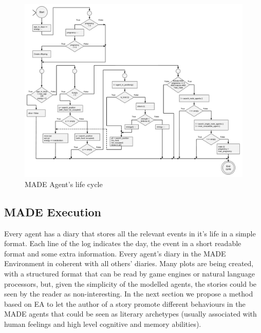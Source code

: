 \documentclass[runningheads]{llncs}
\begin{document}
\begin{figure}
\begin{center}
\includegraphics[scale=0.32]{img/life_cycle.pdf}
\caption{MADE Agent's life cycle}
\label{fig:lifecycle}
\end{center}
\end{figure}



\subsection{MADE Execution}

Every agent has a diary that stores all the relevant events in it's life in a simple format. Each line of the log indicates the day, the event in a short readable format and some extra information. Every agent's diary in the MADE Environment in coherent with all others' diaries. Many plots are being created, with a structured format that can be read by game engines or natural language processors, but, given the simplicity of the modelled agents, the stories could be seen by the reader as non-interesting. In the next section we propose a method based on EA to let the author of a story promote different behaviours in the MADE agents that could be seen as literary archetypes (usually associated with human feelings and high level cognitive and memory abilities).
\end{document}
